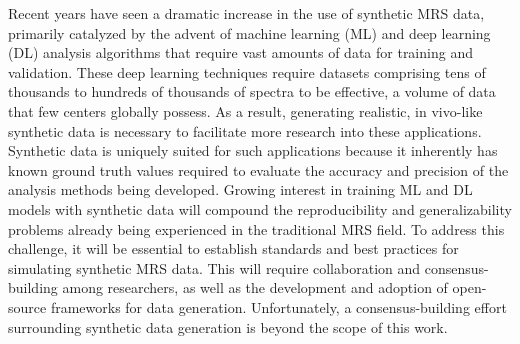 Recent years have seen a dramatic increase in the use of synthetic MRS data, primarily catalyzed by the advent of machine learning\cite{Das2017} (ML) and deep learning\cite{Gurbani2019, Hatami, Lee2019} (DL) analysis algorithms that require vast amounts of data for training and validation. 
These deep learning techniques require datasets comprising tens of thousands to hundreds of thousands of spectra to be effective, a volume of data that few centers globally possess. As a result, generating realistic, in vivo-like synthetic data is necessary to facilitate more research into these applications. Synthetic data is uniquely suited for such applications because it inherently has known ground truth values required to evaluate the accuracy and precision of the analysis methods being developed. 
Growing interest in training ML and DL models with synthetic data will compound the reproducibility and generalizability problems already being experienced in the traditional MRS field.\cite{Craven2022,Marjanska2021,Marjanska2022,Zollner2021} To address this challenge, it will be essential to establish standards and best practices for simulating synthetic MRS data. This will require collaboration and consensus-building among researchers, as well as the development and adoption of open-source frameworks for data generation. Unfortunately, a consensus-building effort surrounding synthetic data generation is beyond the scope of this work.  %


